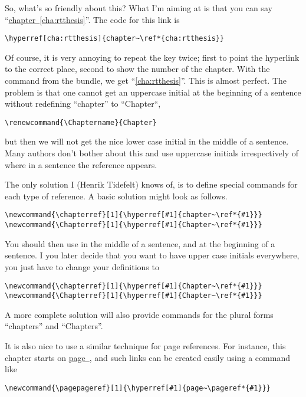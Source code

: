 So, what's so friendly about this?  What I'm aiming at is that you can say “\hyperref[cha:rtthesis]{chapter~\ref*{cha:rtthesis}}”.  The code for this link is
{\verbatimsize
\begin{verbatim}
\hyperref[cha:rtthesis]{chapter~\ref*{cha:rtthesis}}
\end{verbatim}}

Of course, it is very annoying to repeat the key twice; first to point the hyperlink to the correct place, second to show the number of the chapter.  With the  command from the  bundle, we get “\autoref{cha:rtthesis}”.  This is almost perfect.  The problem is that one cannot get an uppercase initial at the beginning of a sentence without redefining “chapter” to “Chapter“,
{\verbatimsize
\begin{verbatim}
\renewcommand{\Chaptername}{Chapter}
\end{verbatim}}
but then we will not get the nice lower case initial in the middle of a sentence.  Many authors don't bother about this and use uppercase initials irrespectively of where in a sentence the reference appears.

The only solution I (Henrik Tidefelt) knows of, is to define special commands for each type of reference.  A basic solution might look as follows.
{\verbatimsize
\begin{verbatim}
\newcommand{\chapterref}[1]{\hyperref[#1]{chapter~\ref*{#1}}}
\newcommand{\Chapterref}[1]{\hyperref[#1]{Chapter~\ref*{#1}}}
\end{verbatim}}

You should then use  in the middle of a sentence, and  at the beginning of a sentence.  I you later decide that you want to have upper case initials everywhere, you just have to change your definitions to
{\verbatimsize
\begin{verbatim}
\newcommand{\chapterref}[1]{\hyperref[#1]{Chapter~\ref*{#1}}}
\newcommand{\Chapterref}[1]{\hyperref[#1]{Chapter~\ref*{#1}}}
\end{verbatim}}

A more complete solution will also provide commands for the plural forms “chapters” and “Chapters”.

It is also nice to use a similar technique for page references.  For instance, this chapter starts on \hyperref[cha:rtthesis]{page~\pageref*{cha:rtthesis}}, and such links can be created easily using a command like
{\verbatimsize
\begin{verbatim}
\newcommand{\pagepageref}[1]{\hyperref[#1]{page~\pageref*{#1}}}
\end{verbatim}}


